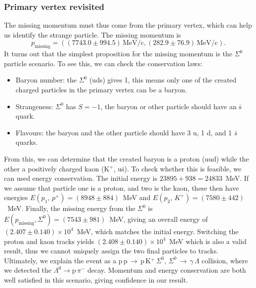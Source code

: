 \documentclass[twocolumn]{article}
\begin{document}
\subsubsection{Primary vertex revisited}
The missing momentum must thus come from the primary vertex, which can help us identify the strange particle. The missing momentum is
\begin{equation}
p_{\text{missing}} = ( (7743.0 \pm 994.5)\, \text{MeV/c,} \, (282.9 \pm 76.9) \, \text{MeV/c} ). \nonumber
\end{equation}
It turns out that the simplest proposition for the missing momentum is the $\Sigma^0$ particle scenario. To see this, we can check the conservation laws:
\begin{itemize}
	\item Baryon number: the $\Sigma^0$ (uds) gives 1, this means only one of the created charged particles in the primary vertex can be a baryon.
	\item Strangeness: $\Sigma^0$ has $S = -1$, the baryon or other particle should have an $\bar{\text{s}}$ quark.
	\item Flavours: the baryon and the other particle should have 3 u, 1 d, and 1 $\bar{s}$ quarks.
\end{itemize}
From this, we can determine that the created baryon is a proton (uud) while the other a positively charged kaon (K$^+$, u$\bar{\text{s}}$). To check whether this is feasible, we can used energy conservation. The initial energy is $23895 + 938 = 24833$~MeV. If we assume that particle one is a proton, and two is the kaon, these then have energies $E(p_1, \, p^+) = (8948 \pm 884)$~MeV and $E(p_2, \, K^+) = (7580 \pm 442)$~MeV. Finally, the missing energy from the $\Sigma^0$ is $E(p_{\text{missing}}, \Sigma^0) = (7543 \pm 981)$~MeV, giving an overall energy of $(2.407 \pm 0.140)\times 10^4$~MeV, which matches the initial energy. Switching the proton and kaon tracks yields $(2.408 \pm 0.140)\times 10^4$~MeV which is also a valid result, thus we cannot uniquely assign the two final particles to tracks. Ultimately, we explain the event as a p$\,$p$\,\rightarrow\,$p$\,$K$^+\,\Sigma^0,\,\Sigma^0 \, \rightarrow \, \gamma \, \Lambda$ collision, where we detected the $\Lambda^0 \rightarrow \text{p}\, \pi^-$ decay. Momentum and energy conservation are both well satisfied in this scenario, giving confidence in our result.
\end{document}
